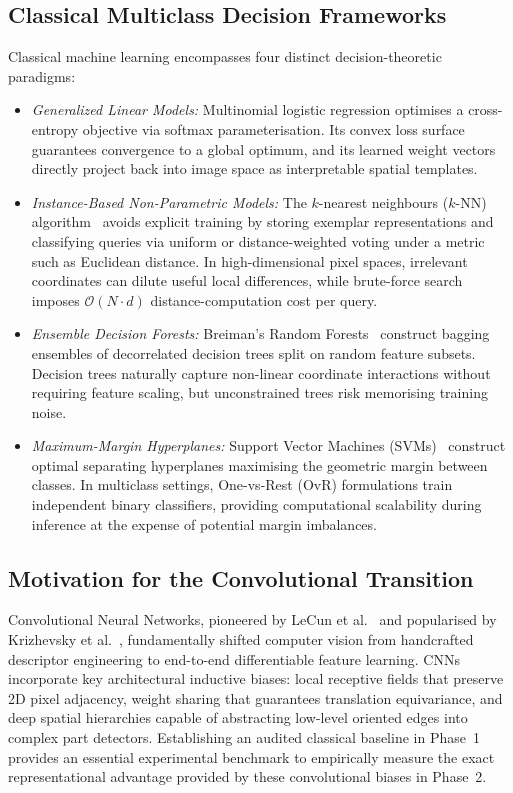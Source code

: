 \documentclass[conference]{IEEEtran}
\begin{document}
\subsection{Classical Multiclass Decision Frameworks}
Classical machine learning encompasses four distinct decision-theoretic
paradigms:
\begin{itemize}
  \item \emph{Generalized Linear Models:} Multinomial logistic regression
    optimises a cross-entropy objective via softmax parameterisation. Its
    convex loss surface guarantees convergence to a global optimum, and
    its learned weight vectors directly project back into image space as
    interpretable spatial templates.
  \item \emph{Instance-Based Non-Parametric Models:} The $k$-nearest
    neighbours ($k$-NN) algorithm~\cite{cover1967knn} avoids explicit
    training by storing exemplar representations and classifying queries
    via uniform or distance-weighted voting under a metric such as
    Euclidean distance. In high-dimensional pixel spaces, irrelevant
    coordinates can dilute useful local differences, while brute-force
    search imposes $\mathcal{O}(N \cdot d)$ distance-computation cost per query.
  \item \emph{Ensemble Decision Forests:} Breiman's Random
    Forests~\cite{breiman2001rf} construct bagging ensembles of
    decorrelated decision trees split on random feature subsets. Decision
    trees naturally capture non-linear coordinate interactions without
    requiring feature scaling, but unconstrained trees risk memorising
    training noise.
  \item \emph{Maximum-Margin Hyperplanes:} Support Vector Machines
    (SVMs)~\cite{cortes1995svm} construct optimal separating hyperplanes
    maximising the geometric margin between classes. In multiclass
    settings, One-vs-Rest (OvR) formulations train independent binary
    classifiers, providing computational scalability during inference at
    the expense of potential margin imbalances.
\end{itemize}

\subsection{Motivation for the Convolutional Transition}
Convolutional Neural Networks, pioneered by LeCun et
al.~\cite{lecun1998mnist} and popularised by Krizhevsky et
al.~\cite{krizhevsky2012imagenet}, fundamentally shifted computer vision
from handcrafted descriptor engineering to end-to-end differentiable
feature learning. CNNs incorporate key architectural inductive biases:
local receptive fields that preserve 2D pixel adjacency, weight sharing
that guarantees translation equivariance, and deep spatial hierarchies
capable of abstracting low-level oriented edges into complex part
detectors. Establishing an audited classical baseline in Phase~1 provides
an essential experimental benchmark to empirically measure the exact
representational advantage provided by these convolutional biases in
Phase~2.
\end{document}
